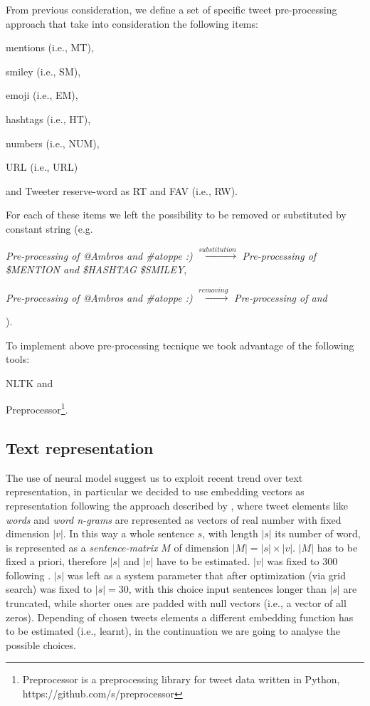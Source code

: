 From previous consideration, we define a set of specific tweet pre-processing approach that take into consideration the following items:
\begin{enumerate*}
\item mentions (i.e., MT),
\item smiley (i.e., SM),
\item emoji (i.e., EM),
\item hashtags (i.e., HT),
\item numbers (i.e., NUM),
\item URL (i.e., URL)
\item and Tweeter reserve-word as RT and FAV (i.e., RW).
\end{enumerate*}

For each of these items we left the possibility to be removed or substituted by constant string (e.g.
\begin{enumerate*}
\item \emph{Pre-processing of @Ambros and \#atoppe :)} $\xrightarrow{substitution} $ \emph{Pre-processing of \$MENTION and \$HASHTAG \$SMILEY},
\item \emph{Pre-processing of @Ambros and \#atoppe :)} $\xrightarrow{removing} $ \emph{Pre-processing of and}
\end{enumerate*}
).

To implement above pre-processing tecnique we took advantage of the following tools:
\begin{enumerate*}
\item NLTK \cite{nltk} and 
\item Preprocessor\footnote{Preprocessor is a preprocessing library for tweet data written in Python, https://github.com/s/preprocessor}.
\end{enumerate*}



\subsection{Text representation} \label{subsec:representation}
The use of neural model suggest us to exploit recent trend over text representation, in particular we decided to use embedding vectors as representation following the approach described by \cite{bojanowski2016enriching}, where tweet elements like \emph{words} and \emph{word n-grams} are represented as vectors of real number with fixed dimension $|v|$.
In this way a whole sentence $s$, with length $|s|$ its number of word, is represented as a \emph{sentence-matrix} $M$ of dimension $|M| = |s| \times |v|$. $|M|$ has to be fixed a priori, therefore $|s|$ and $|v|$ have to be estimated. $|v|$ was fixed to 300 following \cite{bojanowski2016enriching}. $|s|$ was left as a system parameter that after optimization (via grid search) was fixed to $|s| = 30$, with this choice 
input sentences longer than $|s|$ are truncated, while shorter ones are padded with null vectors (i.e., a vector of all zeros).
Depending of chosen tweets elements a different embedding function has to be estimated (i.e., learnt), in the continuation we are going to analyse the possible choices.

